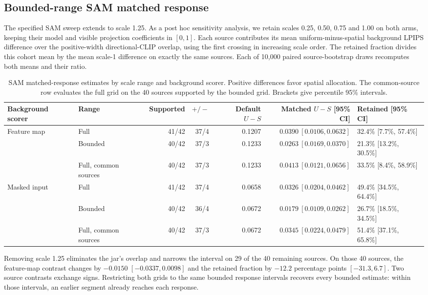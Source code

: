\subsection{Bounded-range SAM matched response}
\label{sec:v21-bounded}
The specified SAM sweep extends to scale 1.25. As a post hoc sensitivity analysis, we retain scales 0.25, 0.50, 0.75 and 1.00 on both arms, keeping their model and visible projection coefficients in $[0,1]$. Each source contributes its mean uniform-minus-spatial background LPIPS difference over the positive-width directional-CLIP overlap, using the first crossing in increasing scale order. The retained fraction divides this cohort mean by the mean scale-1 difference on exactly the same sources. Each of 10,000 paired source-bootstrap draws recomputes both means and their ratio.

\begin{table}[t]
\centering\footnotesize
\caption{SAM matched-response estimates by scale range and background scorer. Positive differences favor spatial allocation. The common-source row evaluates the full grid on the 40 sources supported by the bounded grid. Brackets give percentile 95\% intervals.}
\label{tab:v21-bounded}
\setlength{\tabcolsep}{4pt}
\begin{tabular}{@{}llrrrrl@{}}
\hline
Background scorer & Range & Supported & $+/-$ & Default $U-S$ & Matched $U-S$ [95\% CI] & Retained [95\% CI]\\
\hline
Feature map & Full & 41/42 & 37/4 & 0.1207 & $0.0390\ [0.0106,0.0632]$ & 32.4\% [7.7\%, 57.4\%]\\
 & Bounded & 40/42 & 37/3 & 0.1233 & $0.0263\ [0.0169,0.0370]$ & 21.3\% [13.2\%, 30.5\%]\\
 & Full, common sources & 40/42 & 37/3 & 0.1233 & $0.0413\ [0.0121,0.0656]$ & 33.5\% [8.4\%, 58.9\%]\\
\hline
Masked input & Full & 41/42 & 37/4 & 0.0658 & $0.0326\ [0.0204,0.0462]$ & 49.4\% [34.5\%, 64.4\%]\\
 & Bounded & 40/42 & 36/4 & 0.0672 & $0.0179\ [0.0109,0.0262]$ & 26.7\% [18.5\%, 34.5\%]\\
 & Full, common sources & 40/42 & 37/3 & 0.0672 & $0.0345\ [0.0224,0.0479]$ & 51.4\% [37.1\%, 65.8\%]\\
\hline
\end{tabular}
\end{table}

Removing scale 1.25 eliminates the jar's overlap and narrows the interval on 29 of the 40 remaining sources. On those 40 sources, the feature-map contrast changes by $-0.0150$ $[-0.0337,0.0098]$ and the retained fraction by $-12.2$ percentage points $[-31.3,6.7]$. Two source contrasts exchange signs. Restricting both grids to the same bounded response intervals recovers every bounded estimate: within those intervals, an earlier segment already reaches each response.
